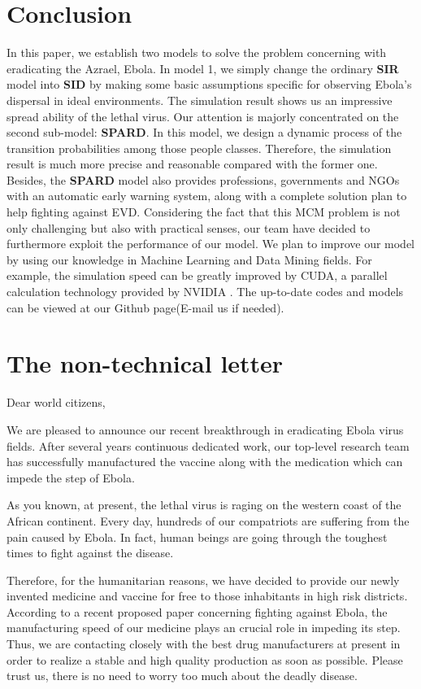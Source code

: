 {\section{Conclusion}
In this paper, we establish two models to solve the problem concerning with eradicating the Azrael, Ebola. In model 1, we simply change the ordinary \textbf{SIR} model into \textbf{SID} by making some basic assumptions specific for observing Ebola's dispersal in ideal environments. The simulation result shows us an impressive spread ability of the lethal virus. Our attention is majorly concentrated on the second sub-model: \textbf{SPARD}. In this model, we design a dynamic process of the transition probabilities among those people classes. Therefore, the simulation result is much more precise and reasonable compared with the former one. Besides, the \textbf{SPARD} model also provides professions, governments and NGOs with an automatic early warning system, along with a complete solution plan to help fighting against EVD. Considering the fact that this MCM problem is not only challenging but also with practical senses, our team have decided to furthermore exploit the performance of our model. We plan to improve our model by using our knowledge in Machine Learning and Data Mining fields. For example, the simulation speed can be greatly improved by CUDA, a parallel calculation technology provided by NVIDIA \cite{nvidiacuda}. The up-to-date codes and models can be viewed at our Github page(E-mail us if needed).

\section{The non-technical letter}
Dear world citizens,

  We are pleased to announce our recent breakthrough in eradicating Ebola virus fields. After several years continuous dedicated work, our top-level research team has successfully manufactured the vaccine along with the medication which can impede the step of Ebola.
  
  As you known, at present, the lethal virus is raging on the western coast of the African continent. Every day, hundreds of our compatriots are suffering from the pain caused by Ebola. In fact, human beings are going through the toughest times to fight against the disease. 
  
  Therefore, for the humanitarian reasons, we have decided to provide our newly invented medicine and vaccine for free to those  inhabitants in high risk districts. According to a recent proposed paper concerning fighting against Ebola, the manufacturing speed of our medicine plays an crucial role in impeding its step. Thus, we are contacting closely with the best drug manufacturers at present in order to realize a stable and high quality production as soon as possible. Please trust us, there is no need to worry too much about the deadly disease. 
  
}
